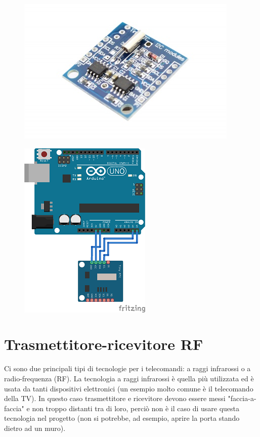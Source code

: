 \documentclass[12pt]{report}
\begin{document}
\begin{figure}
	\centering
	\begin{minipage}{0.5\textwidth}
		\centering
		\includegraphics[width=0.5\linewidth]{./img/tinyRTC.jpg}
		\label{fig:tinyRTC}
	\end{minipage}%
	\begin{minipage}{0.5\textwidth}
		\centering
		\includegraphics[width=0.5\linewidth]{./img/tinyRTC_uno.png}
		\label{fig:tinyRTC_uno}
	\end{minipage}
\end{figure}

%
\section{Trasmettitore-ricevitore RF}
%

Ci sono due principali tipi di tecnologie per i telecomandi: a raggi infrarossi o a radio-frequenza (RF).
La tecnologia a raggi infrarossi è quella più utilizzata ed è usata da tanti dispositivi elettronici (un esempio molto comune è il telecomando della TV). In questo caso trasmettitore e ricevitore devono essere messi "faccia-a-faccia" e non troppo distanti tra di loro, perciò non è il caso di usare questa tecnologia nel progetto (non si potrebbe, ad esempio, aprire la porta stando dietro ad un muro).
\end{document}
